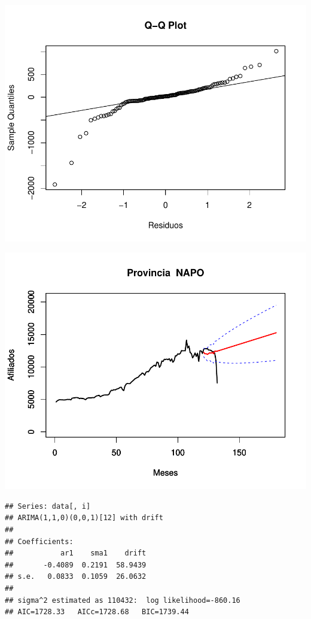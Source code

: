 \documentclass[11pt,a4paper,oneside]{article}\usepackage[]{graphicx}\usepackage[]{color}
\makeatletter
\def\maxwidth{ %
  \ifdim\Gin@nat@width>\linewidth
    \linewidth
  \else
    \Gin@nat@width
  \fi
}
\newenvironment{kframe}{%
 \def\at@end@of@kframe{}%
 \ifinner\ifhmode%
  \def\at@end@of@kframe{\end{minipage}}%
  \begin{minipage}{\columnwidth}%
 \fi\fi%
 \def\FrameCommand##1{\hskip\@totalleftmargin \hskip-\fboxsep
 \colorbox{shadecolor}{##1}\hskip-\fboxsep
     \hskip-\linewidth \hskip-\@totalleftmargin \hskip\columnwidth}%
 \MakeFramed {\advance\hsize-\width
   \@totalleftmargin\z@ \linewidth\hsize
   \@setminipage}}%
 {\par\unskip\endMakeFramed%
 \at@end@of@kframe}
\newenvironment{knitrout}{}{} %
\makeatother
\begin{document}
\begin{knitrout}
{}




{\centering \includegraphics[width=\maxwidth]{figure/unnamed-chunk-16-45} 

}




{\centering \includegraphics[width=\maxwidth]{figure/unnamed-chunk-16-46} 

}


\begin{kframe}\begin{verbatim}
## Series: data[, i] 
## ARIMA(1,1,0)(0,0,1)[12] with drift         
## 
## Coefficients:
##           ar1    sma1    drift
##       -0.4089  0.2191  58.9439
## s.e.   0.0833  0.1059  26.0632
## 
## sigma^2 estimated as 110432:  log likelihood=-860.16
## AIC=1728.33   AICc=1728.68   BIC=1739.44
\end{verbatim}
\end{kframe}


\end{knitrout}
\end{document}

